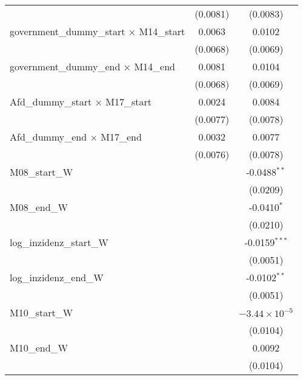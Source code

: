 \documentclass[10pt,a4paper]{article}
\begin{document}
\begin{tabular}{lcc}
                                                    & (0.0081)        & (0.0083)\\   
   government\_dummy\_start $\times$ M14\_start     & 0.0063          & 0.0102\\   
                                                    & (0.0068)        & (0.0069)\\   
   government\_dummy\_end $\times$ M14\_end         & 0.0081          & 0.0104\\   
                                                    & (0.0068)        & (0.0069)\\   
   Afd\_dummy\_start $\times$ M17\_start            & 0.0024          & 0.0084\\   
                                                    & (0.0077)        & (0.0078)\\   
   Afd\_dummy\_end $\times$ M17\_end                & 0.0032          & 0.0077\\   
                                                    & (0.0076)        & (0.0078)\\   
   M08\_start\_W                                    &                 & -0.0488$^{**}$\\   
                                                    &                 & (0.0209)\\   
   M08\_end\_W                                      &                 & -0.0410$^{*}$\\   
                                                    &                 & (0.0210)\\   
   log\_inzidenz\_start\_W                          &                 & -0.0159$^{***}$\\   
                                                    &                 & (0.0051)\\   
   log\_inzidenz\_end\_W                            &                 & -0.0102$^{**}$\\   
                                                    &                 & (0.0051)\\   
   M10\_start\_W                                    &                 & $-3.44\times 10^{-5}$\\    
                                                    &                 & (0.0104)\\   
   M10\_end\_W                                      &                 & 0.0092\\   
                                                    &                 & (0.0104)\\   

\end{tabular}
\end{document}
